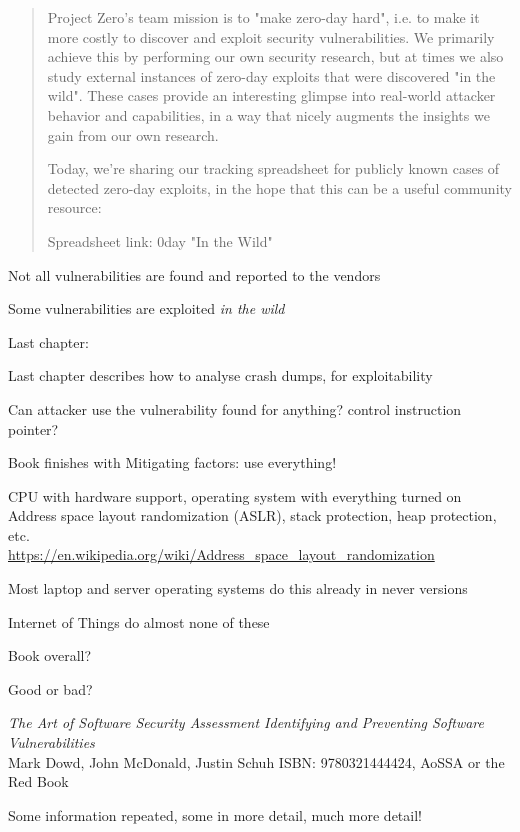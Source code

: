 \documentclass[Screen16to9,17pt]{foils}
\begin{document}
\begin{quote}

  Project Zero's team mission is to "make zero-day hard", i.e. to make it more costly to discover and exploit security vulnerabilities. We primarily achieve this by performing our own security research, but at times we also study external instances of zero-day exploits that were discovered "in the wild". These cases provide an interesting glimpse into real-world attacker behavior and capabilities, in a way that nicely augments the insights we gain from our own research.

  Today, we're sharing our tracking spreadsheet for publicly known cases of detected zero-day exploits, in the hope that this can be a useful community resource:

  Spreadsheet link: 0day "In the Wild"\\
\end{quote}

\begin{list2}
\item Not all vulnerabilities are found and reported to the vendors
\item Some vulnerabilities are exploited \emph{in the wild}
\end{list2}


Last chapter:
\begin{list2}
\item Last chapter describes how to analyse crash dumps, for exploitability
\item Can attacker use the vulnerability found for anything? control instruction pointer?
\item Book finishes with Mitigating factors: use everything!
\item CPU with hardware support, operating system with everything turned on Address space layout randomization (ASLR), stack protection, heap protection, etc.\\
\url{https://en.wikipedia.org/wiki/Address_space_layout_randomization}
\item Most laptop and server operating systems do this already in never versions\smiley
\item Internet of Things do almost none of these
\end{list2}

Book overall?

Good or bad?




\emph{The Art of Software Security Assessment Identifying and Preventing
Software Vulnerabilities}\\
Mark Dowd, John McDonald, Justin Schuh ISBN: 9780321444424, AoSSA or the Red Book

Some information repeated, some in more detail, much more detail!

\end{document}

